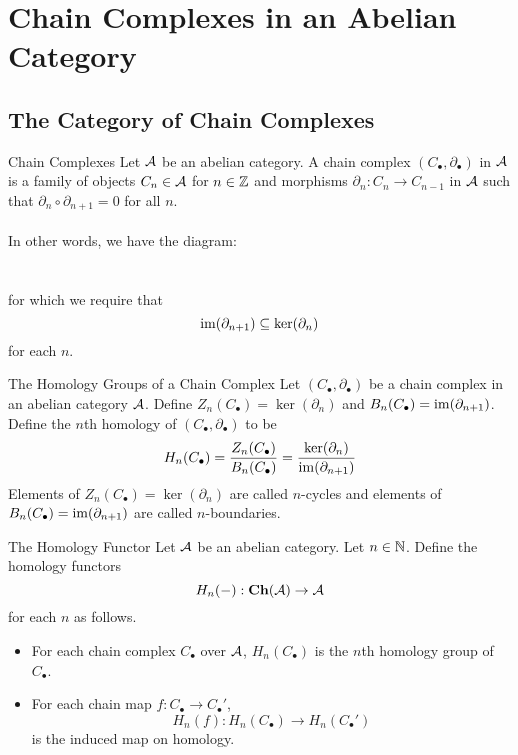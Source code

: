 \documentclass[a4paper]{article}
\begin{document}
\pagebreak
\section{Chain Complexes in an Abelian Category}
\subsection{The Category of Chain Complexes}
\begin{defn}{Chain Complexes}{} Let $\mathcal{A}$ be an abelian category. A chain complex $(C_\bullet,\partial_\bullet)$ in $\mathcal{A}$ is a family of objects $C_n\in\mathcal{A}$ for $n\in\mathbb{Z}$ and morphisms $\partial_n:C_n\to C_{n-1}$ in $\mathcal{A}$ such that $\partial_n\circ\partial_{n+1}=0$ for all $n$. \\~\\
In other words, we have the diagram: \\
\\~\\
for which we require that $$\operatorname{im}(\partial_{n+1})\subseteq\ker(\partial_n)$$ for each $n$. 
\end{defn}

\begin{defn}{The Homology Groups of a Chain Complex}{} Let $(C_\bullet,\partial_\bullet)$ be a chain complex in an abelian category $\mathcal{A}$. Define $Z_n(C_\bullet)=\ker(\partial_n)$ and $B_n(C_\bullet)=\operatorname{im}(\partial_{n+1})$. Define the $n$th homology of $(C_\bullet,\partial_\bullet)$ to be $$H_n(C_\bullet)=\frac{Z_n(C_\bullet)}{B_n(C_\bullet)}=\frac{\ker(\partial_n)}{\operatorname{im}(\partial_{n+1})}$$
Elements of $Z_n(C_\bullet)=\ker(\partial_n)$ are called $n$-cycles and elements of $B_n(C_\bullet)=\operatorname{im}(\partial_{n+1})$ are called $n$-boundaries. 
\end{defn}

\begin{defn}{The Homology Functor}{} Let $\mathcal{A}$ be an abelian category. Let $n\in\mathbb{N}$. Define the homology functors $$H_n(-):\bold{Ch}(\mathcal{A})\to\mathcal{A}$$ for each $n$ as follows. 
\begin{itemize}
\item For each chain complex $C_\bullet$ over $\mathcal{A}$, $H_n(C_\bullet)$ is the $n$th homology group of $C_\bullet$. 
\item For each chain map $f:C_\bullet\to C_\bullet'$, $$H_n(f):H_n(C_\bullet)\to H_n(C_\bullet')$$ is the induced map on homology. 
\end{itemize}
\end{defn}
\end{document}
